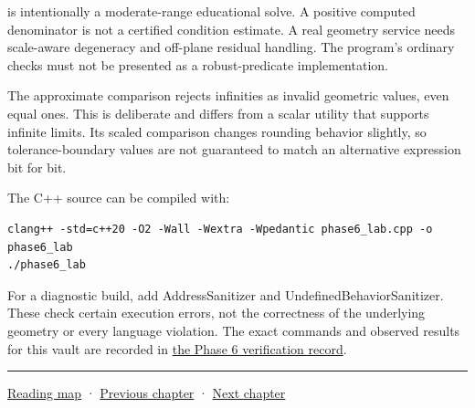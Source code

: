  is intentionally a moderate-range educational solve. A positive computed denominator is not a certified condition estimate. A real geometry service needs scale-aware degeneracy and off-plane residual handling. The program's ordinary checks must not be presented as a robust-predicate implementation.

The approximate comparison rejects infinities as invalid geometric values, even equal ones. This is deliberate and differs from a scalar utility that supports infinite limits. Its scaled comparison changes rounding behavior slightly, so tolerance-boundary values are not guaranteed to match an alternative expression bit for bit.

The C++ source can be compiled with:

\begin{verbatim}
clang++ -std=c++20 -O2 -Wall -Wextra -Wpedantic phase6_lab.cpp -o phase6_lab
./phase6_lab
\end{verbatim}

For a diagnostic build, add AddressSanitizer and UndefinedBehaviorSanitizer. These check certain execution errors, not the correctness of the underlying geometry or every language violation. The exact commands and observed results for this vault are recorded in \hyperref[appendix-a103e7846d21-phase-6---source-analysis-and-verification]{the Phase 6 verification record}.

\begin{center}\rule{0.5\linewidth}{0.5pt}\end{center}

\hyperref[volume-reading-map]{Reading map} · \hyperref[02-foundations-ii-ch036-exposure-physical-optics-and-depth-of-field]{Previous chapter} · \hyperref[02-foundations-ii-ch038-reconstruct-the-complete-geometry-pipeline]{Next chapter}
